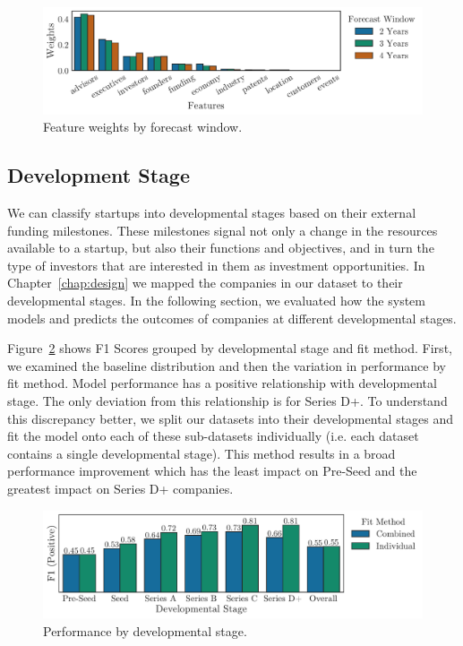 \documentclass[../thesis/thesis.tex]{subfiles}
\begin{document}
\begin{figure}[!htb]
    \centering
    \includegraphics[width=\textwidth]{../figures/evaluation/features_window}
    \caption[Feature weights by forecast window]{Feature weights by forecast window.}
    \label{fig:evaluation:features_window}
\end{figure}

\subsection{Development Stage}

We can classify startups into developmental stages based on their external funding milestones. These milestones signal not only a change in the resources available to a startup, but also their functions and objectives, and in turn the type of investors that are interested in them as investment opportunities. In Chapter~\ref{chap:design} we mapped the companies in our dataset to their developmental stages. In the following section, we evaluated how the system models and predicts the outcomes of companies at different developmental stages.

Figure~\ref{fig:evaluation:performance_stage} shows F1 Scores grouped by developmental stage and fit method. First, we examined the baseline distribution and then the variation in performance by fit method. Model performance has a positive relationship with developmental stage. The only deviation from this relationship is for Series D+. To understand this discrepancy better, we split our datasets into their developmental stages and fit the model onto each of these sub-datasets individually (i.e. each dataset contains a single developmental stage). This method results in a broad performance improvement which has the least impact on Pre-Seed and the greatest impact on Series D+ companies.

\begin{figure}[!htb]
    \centering
    \includegraphics[width=\textwidth]{../figures/evaluation/performance_stage}
    \caption[Performance by developmental stage]{Performance by developmental stage.}
    \label{fig:evaluation:performance_stage}
\end{figure}
\end{document}
